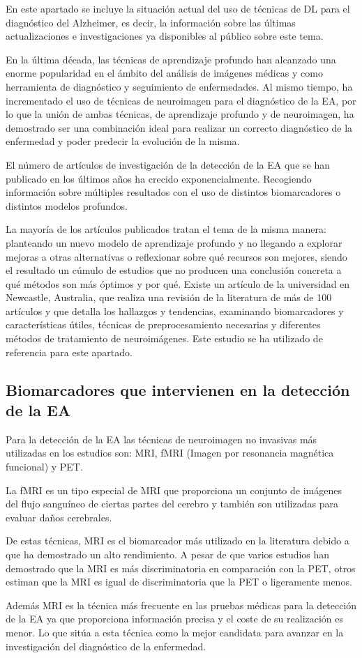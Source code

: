 
En este apartado se incluye la situación actual del uso de técnicas de DL para el diagnóstico del Alzheimer, es decir,
la información sobre las últimas actualizaciones e investigaciones ya disponibles al público sobre este tema.

En la última década, las técnicas de aprendizaje profundo han alcanzado una enorme popularidad en el ámbito del análisis
de imágenes médicas y como herramienta de diagnóstico y seguimiento de enfermedades.
Al mismo tiempo, ha incrementado el uso de técnicas de neuroimagen para el diagnóstico de la EA, por lo que la unión de
ambas técnicas, de aprendizaje profundo y de neuroimagen, ha demostrado ser una combinación ideal para realizar un
correcto diagnóstico de la enfermedad y poder predecir la evolución de la misma.

El número de artículos de investigación de la detección de la EA que se han publicado en los últimos años ha crecido
exponencialmente.
Recogiendo información sobre múltiples resultados con el uso de distintos biomarcadores o distintos modelos profundos.

La mayoría de los artículos publicados tratan el tema de la misma manera: planteando un nuevo modelo de aprendizaje
profundo y no llegando a explorar mejoras a otras alternativas o reflexionar sobre qué recursos son mejores, siendo el
resultado un cúmulo de estudios que no producen una conclusión concreta a qué métodos son más óptimos y por qué.
Existe un artículo de la universidad en Newcastle, Australia, que realiza una revisión de la literatura de más de 100
artículos y que detalla los hallazgos y tendencias, examinando biomarcadores y características útiles, técnicas de
preprocesamiento necesarias y diferentes métodos de tratamiento de neuroimágenes.
Este estudio se ha utilizado de referencia para este apartado.

\subsection{Biomarcadores que intervienen en la detección de la EA}\label{subsec:biomarcadores-estado-del-arte}
Para la detección de la EA las técnicas de neuroimagen no invasivas más utilizadas en los estudios son: MRI, fMRI
(Imagen por resonancia magnética funcional)  y PET.

La fMRI es un tipo especial de MRI que proporciona un conjunto de imágenes del flujo sanguíneo de ciertas partes del
cerebro y también son utilizadas para evaluar daños cerebrales.

De estas técnicas, MRI es el biomarcador más utilizado en la literatura debido a que ha demostrado un alto rendimiento.
A pesar de que varios estudios han demostrado que la MRI es más discriminatoria en comparación con la PET, otros estiman
que la MRI es igual de discriminatoria que la PET o ligeramente menos.

Además MRI es la técnica más frecuente en las pruebas médicas para la detección de la EA ya que proporciona información
precisa y el coste de su realización es menor.
Lo que sitúa a esta técnica como la mejor candidata para avanzar en la investigación del diagnóstico de la enfermedad.
